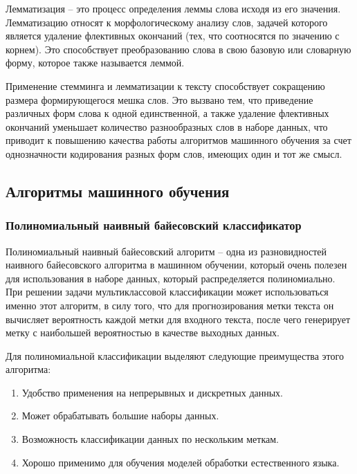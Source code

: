 \documentclass[bachelor, och, coursework]{SCWorks}
\begin{document}
            Лемматизация – это процесс определения леммы слова исходя из его
            значения. Лемматизацию относят к морфологическому анализу слов,
            задачей которого является удаление флективных окончаний (тех, что
            соотносятся по значению с корнем). Это способствует преобразованию
            слова в свою базовую или словарную форму, которое также называется
            леммой.

            Применение стемминга и лемматизации к тексту способствует сокращению
            размера формирующегося мешка слов. Это вызвано тем, что приведение
            различных форм слова к одной единственной, а также удаление
            флективных окончаний уменьшает количество разнообразных слов в
            наборе данных, что приводит к повышению качества работы алгоритмов
            машинного обучения за счет однозначности кодирования разных форм
            слов, имеющих один и тот же смысл.
            

    \subsection{Алгоритмы машинного обучения}
        \subsubsection{Полиномиальный наивный байесовский классификатор}
            

            Полиномиальный наивный байесовский алгоритм – одна из разновидностей
            наивного байесовского алгоритма в машинном обучении, который очень
            полезен для использования в наборе данных, который распределяется
            полиномиально. При решении задачи мультиклассовой классификации
            может использоваться именно этот алгоритм, в силу того, что для
            прогнозирования метки текста он вычисляет вероятность каждой метки
            для входного текста, после чего генерирует метку с наибольшей
            вероятностью в качестве выходных данных.

            Для полиномиальной классификации выделяют следующие преимущества
            этого алгоритма:

                \begin{enumerate}
                    \item Удобство применения на непрерывных и дискретных
                    данных.
                    \item Может обрабатывать большие наборы данных.
                    \item Возможность классификации данных по нескольким меткам.
                    \item Хорошо применимо для обучения моделей обработки
                    естественного языка.
                \end{enumerate}
\end{document}
